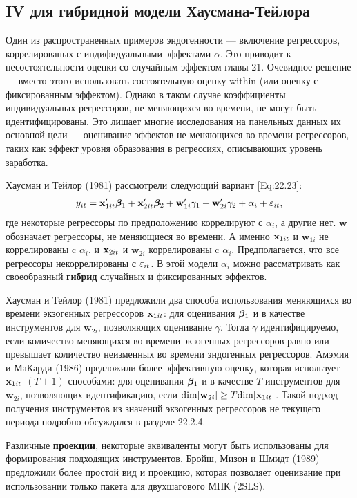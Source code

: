 \subsection{IV для гибридной модели Хаусмана-Тейлора}

Один из распространенных примеров эндогенности --- включение регрессоров, коррелированых с индифидуальными эффектами $\alpha$. Это приводит к несостоятельности оценки со случайным эффектом главы 21. Очевидное решение  --- вместо этого использовать состоятельную оценку within (или оценку с фиксированным эффектом). Однако в таком случае коэффициенты индивидуальных регрессоров, не меняющихся во времени, не могут быть идентифицированы. Это лишает многие исследования на панельных данных их основной цели --- оценивание эффектов не меняющихся во времени регрессоров, таких как эффект уровня образования  в регрессиях, описывающих уровень заработка.

Хаусман и Тейлор (1981) рассмотрели следующий вариант \ref{Eq:22.23}:
\begin{align}
y_{it}=\mathbf{x}'_{1it}\bm{\beta}_1+\mathbf{x}'_{2it}\bm{\beta}_2 + \mathbf w'_{1i}\gamma_1+ \mathbf w'_{2i} \gamma_2 + \alpha_i + \varepsilon_{it},
\label{Eq:22.29}
\end{align}
где некоторые регрессоры по предположению коррелируют с $\alpha_i$, а другие нет. $\mathbf w$ обозначает регрессоры, не меняющиеся во времени. А именно $\mathbf{x}_{1it}$ и $\mathbf w_{1i}$ не коррелированы c $\alpha_i$, и $\mathbf{x}_{2it}$ и $\mathbf w_{2i}$ коррелированы c $\alpha_i$. Предполагается, что все регрессоры некоррелированы с $\varepsilon_{it}$. В этой модели $\alpha_i$ можно рассматривать как своеобразный \textbf{гибрид} случайных и фиксированных эффектов.

Хаусман и Тейлор (1981) предложили два способа использования меняющихся во времени экзогенных регрессоров $\mathbf{x}_{1it}$: для оценивания $\bm{\beta}_1$  и в качестве инструментов для  $\mathbf w_{2i}$, позволяющих оценивание $\gamma$. Тогда $\gamma$ идентифицируемо, если количество меняющихся во времени экзогенных регрессоров равно или превышает количество неизменных во времени эндогенных регрессоров. Амэмия и МаКарди (1986) предложили более эффективную оценку, которая использует $\mathbf{x}_{1it}$ $(T+1)$ способами: для оценивания $\bm{\beta}_1$ и в качестве $T$ инструментов для $\mathbf w_{2i}$, позволяющих идентификацию, если $\mathrm{dim}[\mathbf w_{2i}] \geq T \mathrm{dim}[\mathbf{x}_{1it}]$. Такой подход получения инструментов из значений экзогенных регрессоров не текущего периода подробно обсуждался в разделе 22.2.4.

Различные \textbf{проекции}, некоторые эквиваленты могут быть использованы для формирования подходящих инструментов. Бройш, Мизон и  Шмидт (1989) предложили более простой вид и проекцию, которая позволяет оценивание при использовании только пакета для двухшагового МНК (2SLS).


